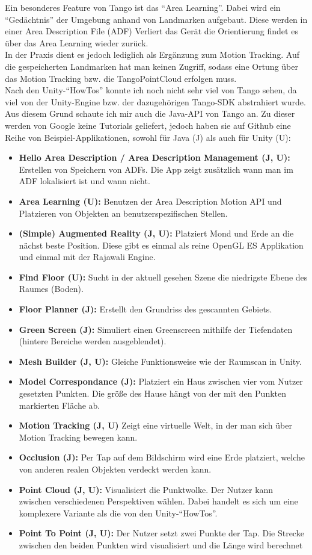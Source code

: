 Ein besonderes Feature von Tango ist das "`Area Learning"'. Dabei wird ein "`Gedächtnis"' der Umgebung anhand von Landmarken aufgebaut. Diese werden in einer Area Description File (ADF) Verliert das Gerät die Orientierung findet es über das Area Learning wieder zurück.\cite{fehling}\\
In der Praxis dient es jedoch lediglich als Ergänzung zum Motion Tracking. Auf die gespeicherten Landmarken hat man keinen Zugriff, sodass eine Ortung über das Motion Tracking bzw. die TangoPointCloud erfolgen muss.\\
Nach den Unity-"`HowTos"' konnte ich noch nicht sehr viel von Tango sehen, da viel von der Unity-Engine bzw. der dazugehörigen Tango-SDK abstrahiert wurde. Aus diesem Grund schaute ich mir auch die Java-API von Tango an. Zu dieser werden von Google keine Tutorials geliefert, jedoch haben sie auf Github eine Reihe von Beispiel-Applikationen, sowohl für Java (J) als auch für Unity (U):
\begin{itemize}
	\item\textbf{Hello Area Description / Area Description Management (J, U):} Erstellen von Speichern von ADFs. Die App zeigt zusätzlich wann man im ADF lokalisiert ist und wann nicht.
	\item\textbf{Area Learning (U):} Benutzen der Area Description Motion API und Platzieren von Objekten an benutzerspezifischen Stellen.
	\item\textbf{(Simple) Augmented Reality (J, U):} Platziert Mond und Erde an die nächst beste Position. Diese gibt es einmal als reine OpenGL ES Applikation und einmal mit der Rajawali Engine.
	\item\textbf{Find Floor (U):} Sucht in der aktuell gesehen Szene die niedrigste Ebene des Raumes (Boden).
	\item\textbf{Floor Planner (J):} Erstellt den Grundriss des gescannten Gebiets.
	\item\textbf{Green Screen (J):} Simuliert einen Greenscreen mithilfe der Tiefendaten (hintere Bereiche werden ausgeblendet).
	\item\textbf{Mesh Builder (J, U):} Gleiche Funktionsweise wie der Raumscan in Unity.
	\item\textbf{Model Correspondance (J):} Platziert ein Haus zwischen vier vom Nutzer gesetzten Punkten. Die größe des Hause hängt von der mit den Punkten markierten Fläche ab.
	\item\textbf{Motion Tracking (J, U)} Zeigt eine virtuelle Welt, in der man sich über Motion Tracking bewegen kann.
	\item\textbf{Occlusion (J):} Per Tap auf dem Bildschirm wird eine Erde platziert, welche von anderen realen Objekten verdeckt werden kann.
	\item\textbf{Point Cloud (J, U):} Visualisiert die Punktwolke. Der Nutzer kann zwischen verschiedenen Perspektiven wählen. Dabei handelt es sich um eine komplexere Variante als die von den Unity-"`HowTos"'.
	\item\textbf{Point To Point (J, U):} Der Nutzer setzt zwei Punkte der Tap. Die Strecke zwischen den beiden Punkten wird visualisiert und die Länge wird berechnet
\end{itemize}